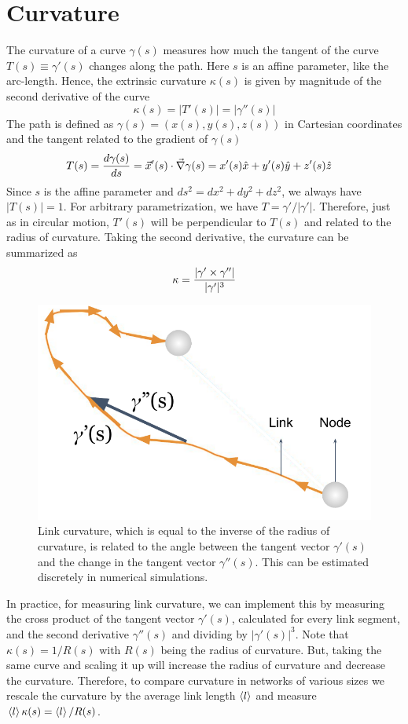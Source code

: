 \documentclass[nofootinbib,preprint,floatfix,titlepage,superscriptaddress]{revtex4} %
\begin{document}
\section{Curvature\label{ap:curvature}}
The curvature of a curve $\gamma(s)$ measures how much the tangent of the curve $T(s) \equiv \gamma'(s)$ changes along the path. 
Here $s$ is an affine parameter, like the arc-length.  
Hence, the extrinsic curvature $\kappa(s)$ is given by magnitude of the second derivative of the curve 
\begin{equation}
    \kappa(s) = |T'(s)| = |\gamma''(s)|
\end{equation}
The path is defined as $\gamma(s) = (x(s),y(s),z(s))$ in Cartesian coordinates and the tangent related to the gradient of $\gamma(s)$
\begin{align}
    T(s) &= {d \gamma(s) \over ds} = \vec{x}'(s)\cdot \vec{\nabla} \gamma(s) = x'(s)\hat{x}+y'(s)\hat{y}+z'(s)\hat{z} 
\end{align}
Since $s$ is the affine parameter and $ds^2 = dx^2 + dy^2 + dz^2$, we always have $|T(s)|=1$. 
For arbitrary parametrization, we have $T = \gamma'/|\gamma'|$.
Therefore, just as in circular motion, $T'(s)$ will be perpendicular to $T(s)$ and related to the radius of curvature. 
Taking the second derivative, the curvature can be summarized as 
\begin{equation}
    \kappa = {|\gamma'\times \gamma''|\over |\gamma'|^{3}}
\end{equation}
\begin{figure}
    \centering
    \includegraphics[width = .5\columnwidth]{fig-09-19/curvature.pdf}
    \caption{Link curvature, which is equal to the inverse of the radius of curvature, is related to the angle between the tangent vector $\gamma'(s)$ and the change in the tangent vector $\gamma''(s)$. This can be estimated discretely in numerical simulations.}
    \label{fig:curvature}
\end{figure}
In practice, for measuring link curvature, we can implement this by measuring the cross product of the tangent vector $\gamma'(s)$, calculated for every link segment, and the second derivative $\gamma''(s)$ and dividing by $|\gamma'(s)|^3$. 
Note that $\kappa(s) = 1/R(s)$ with $R(s)$ being the radius of curvature. 
But, taking the same curve and scaling it up will increase the radius of curvature and decrease the curvature. 
Therefore, to compare curvature in networks of various sizes we rescale the curvature by the average link length $\left<l\right>$ and measure $\left<l\right>\kappa(s) = \left<l\right>/R(s)$.
\end{document}

